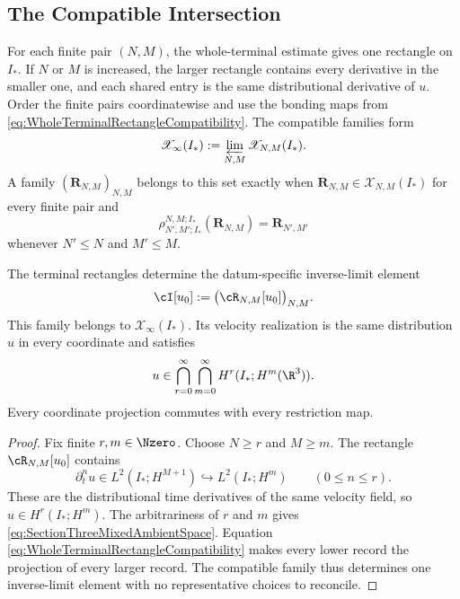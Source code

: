 \subsection{The Compatible Intersection}\label{sub:TheCompatibleIntersection}

For each finite pair \((N,M)\), the whole-terminal estimate gives one rectangle on \(I_*\).
If \(N\) or \(M\) is increased, the larger rectangle contains every derivative in the smaller one, and each shared entry is the same distributional derivative of \(u\).
Order the finite pairs coordinatewise and use the bonding maps from \eqref{eq:WholeTerminalRectangleCompatibility}.
The compatible families form
\[
  \mathscr X_\infty(I_*)
  :=
  \varprojlim_{N,M}\mathscr X_{N,M}(I_*).
\]
A family \((\mathbf R_{N,M})_{N,M}\) belongs to this set exactly when \(\mathbf R_{N,M}\in\mathscr X_{N,M}(I_*)\) for every finite pair and
\[
  \rho_{N',M';I_*}^{N,M;I_*}(\mathbf R_{N,M})
  =\mathbf R_{N',M'}
\]
whenever \(N'\leq N\) and \(M'\leq M\).

\begin{proposition}\label{prop:CompatibleProjectiveAssembly}
The terminal rectangles determine the datum-specific inverse-limit element
\[
  \cI[u_0]
  :=
  \bigl(\cR_{N,M}[u_0]\bigr)_{N,M}.
\]
This family belongs to \(\mathscr X_\infty(I_*)\).
Its velocity realization is the same distribution \(u\) in every coordinate and satisfies
\begin{equation}\label{eq:SectionThreeMixedAmbientSpace}
  u\in
  \bigcap_{r=0}^{\infty}
  \bigcap_{m=0}^{\infty}
  H^r(I_*;H^m(\R^3)).
\end{equation}
Every coordinate projection commutes with every restriction map.
\end{proposition}

\begin{proof}
Fix finite \(r,m\in\Nzero\).
Choose \(N\geq r\) and \(M\geq m\).
The rectangle \(\cR_{N,M}[u_0]\) contains
\[
  \partial_t^n u\in L^2(I_*;H^{M+1})
  \hookrightarrow L^2(I_*;H^m)
  \qquad(0\leq n\leq r).
\]
These are the distributional time derivatives of the same velocity field, so \(u\in H^r(I_*;H^m)\).
The arbitrariness of \(r\) and \(m\) gives \eqref{eq:SectionThreeMixedAmbientSpace}.
Equation \eqref{eq:WholeTerminalRectangleCompatibility} makes every lower record the projection of every larger record.
The compatible family thus determines one inverse-limit element with no representative choices to reconcile.
\end{proof}

